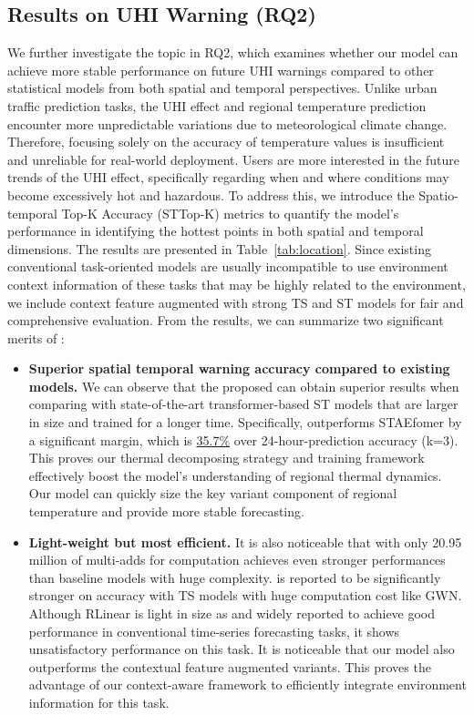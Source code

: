 
\subsection{Results on UHI Warning (RQ2)}
We further investigate the topic in RQ2, which examines whether our model can achieve more stable performance on future UHI warnings compared to other statistical models from both spatial and temporal perspectives. Unlike urban traffic prediction tasks, the UHI effect and regional temperature prediction encounter more unpredictable variations due to meteorological climate change. Therefore, focusing solely on the accuracy of temperature values is insufficient and unreliable for real-world deployment. Users are more interested in the future trends of the UHI effect, specifically regarding when and where conditions may become excessively hot and hazardous. To address this, we introduce the Spatio-temporal Top-K Accuracy (STTop-K) metrics to quantify the model's performance in identifying the hottest points in both spatial and temporal dimensions. The results are presented in Table~\ref{tab:location}. 
Since existing conventional task-oriented models are usually incompatible to use environment context information of these tasks that may be highly related to the environment, we include context feature augmented with strong TS and ST models for fair and comprehensive evaluation. From the results, we can summarize two significant merits of \model:


\begin{itemize}[leftmargin=*]
    \item \textbf{Superior spatial temporal warning accuracy compared to existing models.} We can observe that the proposed \model can obtain superior results when comparing with state-of-the-art transformer-based ST models that are larger in size and trained for a longer time. Specifically, \model outperforms STAEfomer by a significant margin, which is \underline{35.7\%} over 24-hour-prediction accuracy (k=3). This proves our thermal decomposing strategy and training framework effectively boost the model's understanding of regional thermal dynamics. Our model can quickly size the key variant component of regional temperature and provide more stable forecasting. 
    \item \textbf{Light-weight but most efficient.} It is also noticeable that \model with only 20.95 million of multi-adds for computation achieves even stronger performances than baseline models with huge complexity. \model is reported to be significantly stronger on accuracy with TS models with huge computation cost like GWN. Although RLinear is light in size as \model and widely reported to achieve good performance in conventional time-series forecasting tasks, it shows unsatisfactory performance on this task. It is noticeable that our model also outperforms the contextual feature augmented variants. This proves the advantage of our context-aware framework to efficiently integrate environment information for this task.
\end{itemize}

